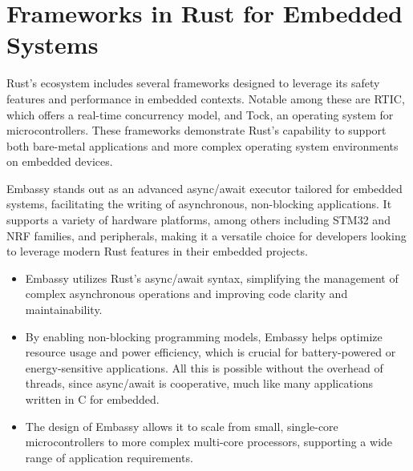 \section{Frameworks in Rust for Embedded Systems}
Rust's ecosystem includes several frameworks designed to leverage its safety features and performance in embedded contexts. Notable among these are RTIC, which offers a real-time concurrency model, and Tock, an operating system for microcontrollers. These frameworks demonstrate Rust's capability to support both bare-metal applications and more complex operating system environments on embedded devices.

Embassy stands out as an advanced async/await executor tailored for embedded systems, facilitating the writing of asynchronous, non-blocking applications. It supports a variety of hardware platforms, among others including STM32 and NRF families, and peripherals, making it a versatile choice for developers looking to leverage modern Rust features in their embedded projects.

\begin{itemize}
    \item Embassy utilizes Rust's async/await syntax, simplifying the management of complex asynchronous operations and improving code clarity and maintainability.
    \item By enabling non-blocking programming models, Embassy helps optimize resource usage and power efficiency, which is crucial for battery-powered or energy-sensitive applications. All this is possible without the overhead of threads, since async/await is cooperative, much like many applications written in C for embedded.
    \item The design of Embassy allows it to scale from small, single-core microcontrollers to more complex multi-core processors, supporting a wide range of application requirements.
\end{itemize}


